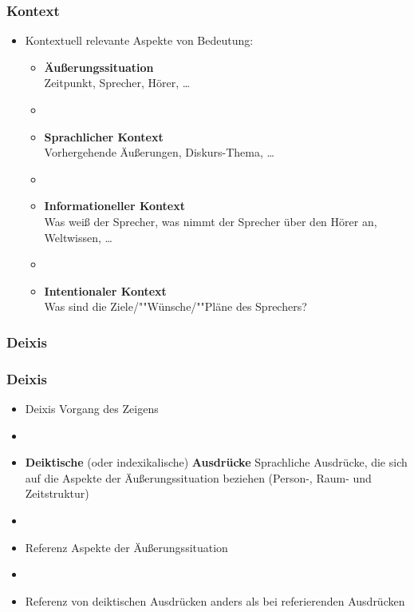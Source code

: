 \begin{frame}
\frametitle{Kontext}

\begin{itemize}
	\item Kontextuell relevante Aspekte von Bedeutung:
	
\vspace{5mm}
	
	\begin{itemize}
		\item \textbf{Äu\ss{}erungssituation} \\
Zeitpunkt, Sprecher, Hörer, \dots
		\item []
		\item \textbf{Sprachlicher Kontext}\\
Vorhergehende Äu\ss{}erungen, Diskurs-Thema, \dots
		\item[]
		\item \textbf{Informationeller Kontext} \\
Was wei\ss{} der Sprecher, was nimmt der Sprecher über den Hörer an, Weltwissen, \dots
		\item []
		\item \textbf{Intentionaler Kontext} \\
Was sind die Ziele/""Wünsche/""Pläne des Sprechers?
	\end{itemize}
	
\end{itemize}

\end{frame}


%
\subsubsection{Deixis}
%

\begin{frame}
\frametitle{Deixis}

\begin{itemize}
	\item Deixis \ras Vorgang des Zeigens
	\item[]
	\item \textbf{Deiktische} (oder indexikalische) \textbf{Ausdrücke} \ras Sprachliche Ausdrücke, die sich auf die Aspekte der Äu\ss{}erungssituation beziehen (Person-, Raum- und Zeitstruktur)
	\item[]
	\item Referenz \ras Aspekte der Äu\ss{}erungssituation
	\item[]
	\item Referenz von deiktischen Ausdrücken anders als bei referierenden Ausdrücken
\end{itemize}

\end{frame}


